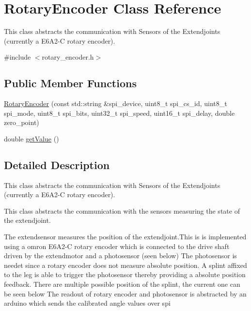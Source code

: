 \hypertarget{classRotaryEncoder}{}\section{Rotary\+Encoder Class Reference}
\label{classRotaryEncoder}


This class abstracts the communication with Sensors of the Extendjoints (currently a E6\+A2-\/C rotary encoder).  




{\ttfamily \#include $<$rotary\+\_\+encoder.\+h$>$}

\subsection*{Public Member Functions}
\begin{DoxyCompactItemize}
\item 
\hyperlink{classRotaryEncoder_a4a133815faa29f99d2a2e53b8568a411}{Rotary\+Encoder} (const std\+::string \&spi\+\_\+device, uint8\+\_\+t spi\+\_\+cs\+\_\+id, uint8\+\_\+t spi\+\_\+mode, uint8\+\_\+t spi\+\_\+bits, uint32\+\_\+t spi\+\_\+speed, uint16\+\_\+t spi\+\_\+delay, double zero\+\_\+point)
\item 
double \hyperlink{classRotaryEncoder_adf89df36f38d0ee87b454f22c25a85f0}{get\+Value} ()
\end{DoxyCompactItemize}


\subsection{Detailed Description}
This class abstracts the communication with Sensors of the Extendjoints (currently a E6\+A2-\/C rotary encoder). 

This class abstracts the communication with the sensors measuring the state of the extendjoint.

The extendsensor measures the position of the extendjoint.\+This is is implemented using a omron E6\+A2-\/C rotary encoder which is connected to the drive shaft driven by the extendmotor and a photosensor (seen below)  The photosensor is needet since a rotary encoder does not measure absolute position. A splint affixed to the leg is able to trigger the photosensor thereby providing a absolute position feedback. There are multiple possible position of the splint, the current one can be seen below  The readout of rotary encoder and photosensor is abstracted by an arduino which sends the calibrated angle values over spi

